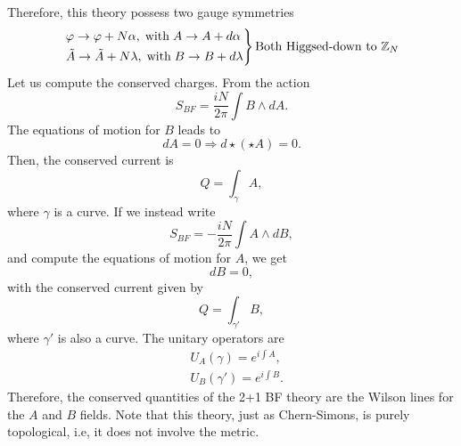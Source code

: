\documentclass{article}
\begin{document}
Therefore, this theory possess two gauge symmetries 
\begin{equation}
		\begin{rcases}
			\varphi\to\varphi+N\alpha,\;\text{with}\;A\to A+d\alpha\\
			\tilde{A}\to\tilde{A}+N\lambda,\;\text{with}\;B\to B+d\lambda
		\end{rcases}\text{Both Higgsed-down to }\mathbb{Z}_N
\end{equation}
Let us compute the conserved charges. From the action 
\begin{equation}
	S_{BF}=\frac{iN}{2\pi}\int B\wedge dA. 
\end{equation}
The equations of motion for $B$ leads to 
\begin{equation}
	dA=0\Rightarrow d\star(\star A)=0.
\end{equation}
Then, the conserved current is 
\begin{equation}
	Q=\int_\gamma A,
\end{equation}
where $\gamma$ is a curve. If we instead write 
\begin{equation}
	S_{BF}=-\frac{iN}{2\pi}\int A\wedge dB,
\end{equation}
and compute the equations of motion for $A$, we get 
\begin{equation}
	dB=0,
\end{equation}
with the conserved current given by 
\begin{equation}
	Q=\int_{\gamma'}B,
\end{equation}
where $\gamma'$ is also a curve. The unitary operators are 
\begin{align}
	&U_A(\gamma)=e^{i\int A},\\
	&U_B(\gamma')=e^{i\int B}.
\end{align}
Therefore, the conserved quantities of the 2+1 BF theory are the Wilson lines for the $A$ and $B$ fields. Note that this theory, just as Chern-Simons, is purely topological, i.e, it does not involve the metric. 
\end{document}
